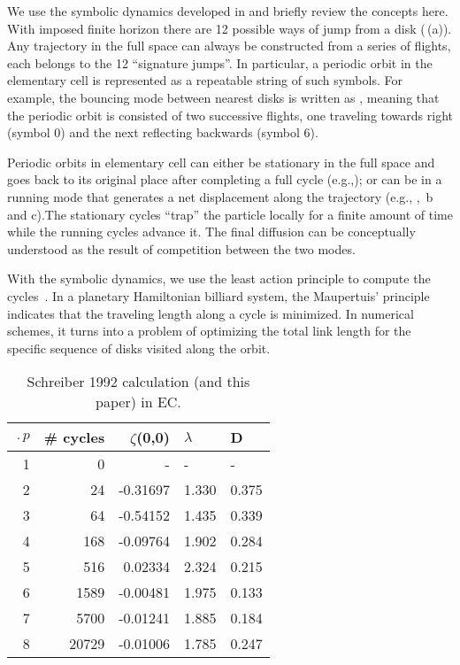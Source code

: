 \documentclass[aps,pre,
                showpacs,
                twocolumn,
                groupedaddress,
                floatfix]{revtex4-1}
\begin{document}
We use the symbolic dynamics developed in  and briefly review the concepts here. With imposed finite horizon there are 12 possible ways of jump from a disk (\,(a)). Any trajectory in the full space can always be constructed from a series of flights, each belongs to  the 12 ``signature jumps''. In particular, a periodic orbit in the elementary cell is represented as a repeatable string of such symbols. For example, the bouncing mode between nearest disks is written as , meaning that the periodic orbit is consisted of two successive flights, one traveling towards right (symbol $0$) and the next reflecting backwards (symbol $6$). 

Periodic orbits in elementary cell can either be stationary in the full space and goes back to its original place after completing a full cycle (e.g.,); or can be in a running mode that generates a net displacement along the trajectory (e.g., , \,b and c).The stationary cycles ``trap'' the  particle locally for a finite amount of time while the running cycles advance it. The final diffusion can be conceptually understood as the result of competition between the two modes.

With the symbolic dynamics, we use the least action principle to compute the cycles~. In a planetary Hamiltonian billiard system, the Maupertuis' principle indicates that the traveling length along a cycle is minimized. In numerical schemes, it turns into a problem of optimizing the total link length for the specific sequence of disks visited along the orbit. 


\begin{table}[htbp]
\begin{tabular}{|r|r|r|l|l|}
\hline
$\period{p}$ & \# cycles & $\zeta$(0,0) & $\lambda$ & D \\ \hline\hline
1      & 0      &   -    &   -  &   - \\
2      & 24     & -0.31697 & 1.330 & 0.375\\
3      & 64     & -0.54152 & 1.435 & 0.339\\
4      & 168    & -0.09764 & 1.902 & 0.284\\
5      & 516    &  0.02334 & 2.324 & 0.215\\
6      & 1589   & -0.00481 & 1.975 & 0.133\\
7      & 5700   & -0.01241 & 1.885 & 0.184\\
8      & 20729  & -0.01006 & 1.785 & 0.247\\ \hline

\end{tabular}
\caption{\label{TCELL1}
Schreiber 1992 calculation (and
  this paper) in EC.
}
\end{table}
\end{document}
